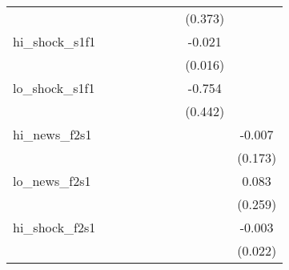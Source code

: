 {\begin{tabular}{l*{8}{c}}
            &                     &                     &                     &                     &                     &                     &     (0.373)         &                     \\
\addlinespace
hi\_shock\_s1f1&                     &                     &                     &                     &                     &                     &      -0.021         &                     \\
            &                     &                     &                     &                     &                     &                     &     (0.016)         &                     \\
\addlinespace
lo\_shock\_s1f1&                     &                     &                     &                     &                     &                     &      -0.754         &                     \\
            &                     &                     &                     &                     &                     &                     &     (0.442)         &                     \\
\addlinespace
hi\_news\_f2s1&                     &                     &                     &                     &                     &                     &                     &      -0.007         \\
            &                     &                     &                     &                     &                     &                     &                     &     (0.173)         \\
\addlinespace
lo\_news\_f2s1&                     &                     &                     &                     &                     &                     &                     &       0.083         \\
            &                     &                     &                     &                     &                     &                     &                     &     (0.259)         \\
\addlinespace
hi\_shock\_f2s1&                     &                     &                     &                     &                     &                     &                     &      -0.003         \\
            &                     &                     &                     &                     &                     &                     &                     &     (0.022)         \\

\end{tabular}}
